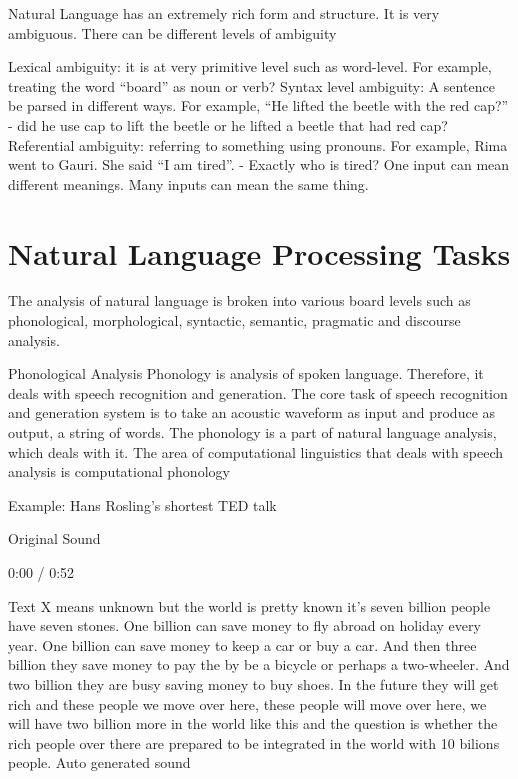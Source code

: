 Natural Language has an extremely rich form and structure. It is very ambiguous. There can be different levels of ambiguity

Lexical ambiguity: it is at very primitive level such as word-level. For example, treating the word “board” as noun or verb?
Syntax level ambiguity: A sentence be parsed in different ways. For example, “He lifted the beetle with the red cap?” - did he use cap to lift the beetle or he lifted a beetle that had red cap?
Referential ambiguity: referring to something using pronouns. For example, Rima went to Gauri. She said “I am tired”. - Exactly who is tired?
One input can mean different meanings.
Many inputs can mean the same thing.

\section{Natural Language Processing Tasks}

The analysis of natural language is broken into various board levels such as phonological, morphological, syntactic, semantic, pragmatic and discourse analysis.



Phonological Analysis
Phonology is analysis of spoken language. Therefore, it deals with speech recognition and generation. The core task of speech recognition and generation system is to take an acoustic waveform as input and produce as output, a string of words. The phonology is a part of natural language analysis, which deals with it. The area of computational linguistics that deals with speech analysis is computational phonology

Example: Hans Rosling’s shortest TED talk

Original Sound

0:00
/ 0:52



Text	X means unknown but the world is pretty known it’s seven billion people have seven stones. One billion can save money to fly abroad on holiday every year. One billion can save money to keep a car or buy a car. And then three billion they save money to pay the by be a bicycle or perhaps a two-wheeler. And two billion they are busy saving money to buy shoes. In the future they will get rich and these people we move over here, these people will move over here, we will have two billion more in the world like this and the question is whether the rich people over there are prepared to be integrated in the world with 10 bilions people.
Auto generated sound

